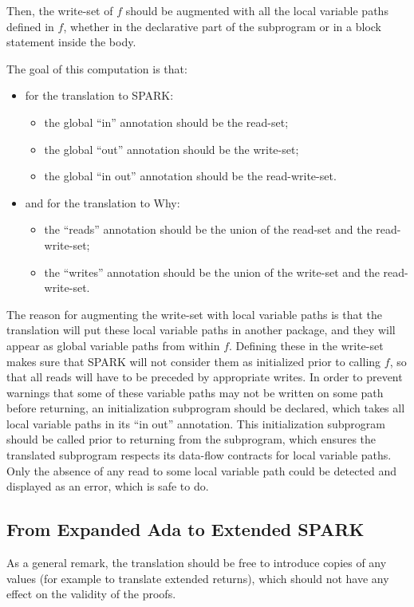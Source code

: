 \documentclass{article}
\newcounter{example}
\begin{document}
Then, the write-set of $f$ should be augmented with all the local variable paths
defined in $f$, whether in the declarative part of the subprogram or in a block
statement inside the body.

The goal of this computation is that:
\begin{itemize}
\item for the translation to SPARK:
\begin{itemize}
\item the global ``in'' annotation should be the read-set;
\item the global ``out'' annotation should be the write-set;
\item the global ``in out'' annotation should be the read-write-set.
\end{itemize}
\item and for the translation to Why:
\begin{itemize}
\item the ``reads'' annotation should be the union of the read-set and the
  read-write-set;
\item the ``writes'' annotation should be the union of the write-set and the
  read-write-set.
\end{itemize}
\end{itemize}

The reason for augmenting the write-set with local variable paths is that the
translation will put these local variable paths in another package, and they
will appear as global variable paths from within $f$. Defining these in the
write-set makes sure that SPARK will not consider them as initialized prior to
calling $f$, so that all reads will have to be preceded by appropriate
writes. In order to prevent warnings that some of these variable paths may not
be written on some path before returning, an initialization subprogram should
be declared, which takes all local variable paths in its ``in out''
annotation. This initialization subprogram should be called prior to returning
from the subprogram, which ensures the translated subprogram respects its
data-flow contracts for local variable paths. Only the absence of any read to
some local variable path could be detected and displayed as an error, which is
safe to do.

\subsection{From Expanded Ada to Extended SPARK}

As a general remark, the translation should be free to introduce copies of any
values (for example to translate extended returns), which should not have any
effect on the validity of the proofs.
\end{document}
